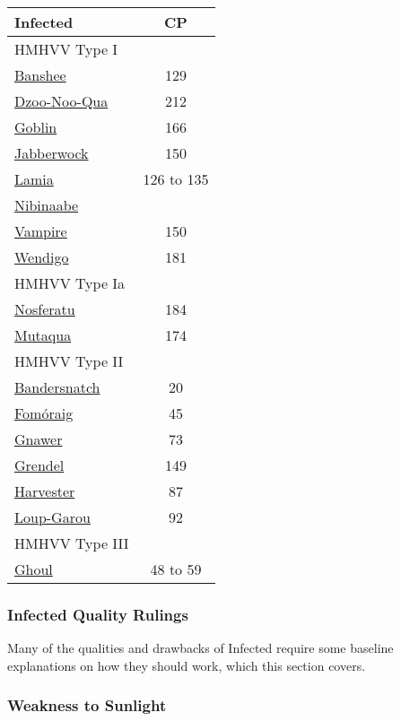 \begin{multicols*}{3}
	
	\begin{center}
		\begin{tabularx}{0.32\textwidth}{|X|c|}
			\hline
			Infected & CP \\
			\hline
			\hline
			HMHVV Type I & \\
			\hline
			\hyperref[banshee]{Banshee} & 129 \\
			\hyperref[dzoo-noo-qua]{Dzoo-Noo-Qua} & 212 \\
			\hyperref[goblin]{Goblin} & 166 \\
			\hyperref[jabberwock]{Jabberwock} & 150 \\
			\hyperref[lamia]{Lamia} & 126 to 135 \\
			\hyperref[nibinaabe]{Nibinaabe} & \\
			\hyperref[vampire]{Vampire} & 150 \\
			\hyperref[wendigo]{Wendigo} & 181 \\
			\hline
			\hline
			HMHVV Type Ia & \\
			\hline
			\hyperref[nosferatu]{Nosferatu} & 184 \\
			\hyperref[mutaqua]{Mutaqua} & 174 \\
			\hline
			\hline
			HMHVV Type II & \\
			\hline
			\hyperref[bandersnatch]{Bandersnatch} & 20 \\
			\hyperref[formoraig]{Fomóraig} & 45 \\
			\hyperref[gnawer]{Gnawer} & 73 \\
			\hyperref[grendel]{Grendel} & 149 \\
			\hyperref[harvester]{Harvester} & 87 \\
			\hyperref[loup-garou]{Loup-Garou} & 92 \\
			\hline
			\hline
			HMHVV Type III & \\
			\hline
			\hyperref[ghoul]{Ghoul} & 48 to 59 \\
			\hline
		\end{tabularx}
	\end{center}
	
	\subsubsection{Infected Quality Rulings}
	
	Many of the qualities and drawbacks of Infected require some baseline explanations on how they should work, which this section covers.
	
	\subsubsection*{Weakness to Sunlight}
	

\end{multicols*}
